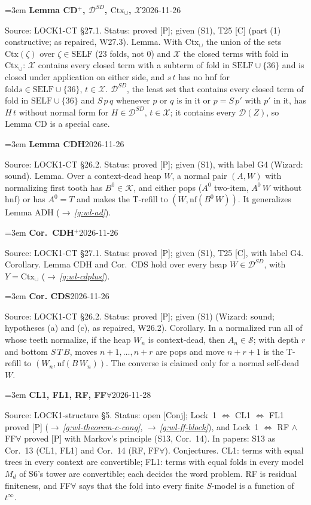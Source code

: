 \documentclass[11pt]{amsart}
\makeatletter
\newcommand{\nf}{\mathrm{nf}}
\newcommand{\fold}{\mathrm{fold}}
\newcommand{\Kc}{\mathcal K}
\newcommand{\Self}{\mathrm{SELF}}
\newcounter{sense}
\newenvironment{entry}[3]{%
  \par\addvspace{\medskipamount}\noindent\phantomsection
  \def\@currentlabel{#2}\label{#1}\setcounter{sense}{0}\raggedright\emergencystretch=3em%
  \textbf{#2}\hfill{\footnotesize\textsf{#3}}\par\nopagebreak\noindent\ignorespaces}%
  {\par}
\newcommand{\src}[1]{\textsf{Source:} #1.\enskip}
\newcommand{\status}[1]{\textsf{Status:} #1.\enskip}
\newcommand{\appears}[1]{\textsf{In papers:} #1.\enskip}
\renewcommand{\see}[1]{$\rightarrow$\,\emph{\ref{#1}}}
\makeatother
\begin{document}
\begin{entry}{g:wl-cdplus}{Lemma CD$^{+}$, $\mathcal D^{SD}$, $\mathrm{Ctx}_\cup$, $\mathcal X$}{2026-11-26}
\src{LOCK1-CT \S27.1}
\status{proved [P]; given (S1), T25 [C] (part (1) constructive; as repaired, W27.3)}
Lemma. With $\mathrm{Ctx}_\cup$ the union of the sets $\mathrm{Ctx}(\zeta)$ over $\zeta\in\Self$ (23
folds, not $0$) and $\mathcal X$ the closed terms with fold in $\mathrm{Ctx}_\cup$: $\mathcal X$
contains every closed term with a subterm of fold in $\Self\cup\{36\}$ and is closed under application
on either side, and $s\,t$ has no hnf for $\fold s\in\Self\cup\{36\}$, $t\in\mathcal X$.
$\mathcal D^{SD}$, the least set that contains every closed term of fold in $\Self\cup\{36\}$ and
$S\,p\,q$ whenever $p$ or $q$ is in it or $p=S\,p'$ with $p'$ in it, has $H\,t$ without normal form for
$H\in\mathcal D^{SD}$, $t\in\mathcal X$; it contains every $\mathcal D(Z)$, so Lemma CD is a special case.
\end{entry}

\begin{entry}{g:wl-cdh}{Lemma CDH}{2026-11-26}
\src{LOCK1-CT \S26.2}
\status{proved [P]; given (S1), with label G4 (Wizard: sound)}
Lemma. Over a context-dead heap $W$, a normal pair $(A,W)$ with normalizing first tooth has
$B^0\in\Kc$, and either pops ($A^0$ two-item, $A^0\,W$ without hnf) or has $A^0=T$ and makes the
T-refill to $(W,\nf(B^0\,W))$. It generalizes Lemma ADH (\see{g:wl-ad}).
\end{entry}

\begin{entry}{g:wl-cdh-plus}{Cor.~CDH$^{+}$}{2026-11-26}
\src{LOCK1-CT \S27.1}
\status{proved [P]; given (S1), T25 [C], with label G4}
Corollary. Lemma CDH and Cor.~CDS hold over every heap $W\in\mathcal D^{SD}$, with
$Y=\mathrm{Ctx}_\cup$ (\see{g:wl-cdplus}).
\end{entry}

\begin{entry}{g:wl-cds}{Cor. CDS}{2026-11-26}
\src{LOCK1-CT \S26.2}
\status{proved [P]; given (S1) (Wizard: sound; hypotheses (a) and (c), as repaired, W26.2)}
Corollary. In a normalized run all of whose teeth normalize, if the heap $W_n$ is context-dead, then
$A_n\in\mathcal S$; with depth $r$ and bottom $S\,T\,B$, moves $n+1,\dots,n+r$ are pops and move
$n+r+1$ is the T-refill to $(W_n,\nf(B\,W_n))$. The converse is claimed only for a normal self-dead
$W$.
\end{entry}

\begin{entry}{g:wl-cl1}{CL1, FL1, RF, FF$\forall$}{2026-11-28}
\src{LOCK1-structure \S5}
\status{open [Conj]; Lock~1 $\Leftrightarrow$ CL1 $\Leftrightarrow$ FL1 proved [P] (\see{g:wl-theorem-c-cong},
\see{g:wl-ff-block}), and Lock~1 $\Leftrightarrow$ RF $\wedge$ FF$\forall$ proved [P] with Markov's principle (S13, Cor.~14)}
\appears{S13 as Cor.~13 (CL1, FL1) and Cor.~14 (RF, FF$\forall$)}
Conjectures. CL1: terms with equal trees in every context are convertible; FL1: terms with equal folds
in every model $M_d$ of S6's tower are convertible; each decides the word problem. RF is residual
finiteness, and FF$\forall$ says that the fold into every finite $S$-model is a function of $t^\infty$.
\end{entry}
\end{document}
